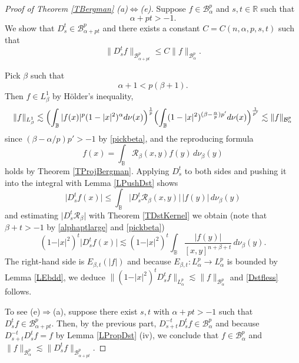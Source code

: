 \documentclass{amsart}
\theoremstyle{definition}
\theoremstyle{remark}
\begin{document}
\begin{proof}[Proof of Theorem \ref{TBergman} (a)$\Leftrightarrow$(e)]
Suppose $f\in\mathcal B^p_\alpha$ and $s,t\in\mathbb R$ such that
\begin{equation}\label{alphaptlarge}
\alpha+pt>-1.
\end{equation}
We show that $D^t_s\in\mathcal B^p_{\alpha+pt}$ and
there exists a constant $C=C(n,\alpha,p,s,t)$ such that
\begin{equation}\label{Dstfless}
\|D^t_s f\|_{\mathcal B^p_{\alpha+pt}}
\le C \|f\|_{\mathcal B^p_\alpha}.
\end{equation}

Pick $\beta$ such that
\begin{equation}\label{pickbeta}
\alpha+1<p(\beta+1).
\end{equation}
Then $f\in L^1_\beta$ by H\"{o}lder's inequality,
\begin{equation}\label{Holderin}
\|f\|_{L^1_\beta}
\lesssim \Bigl(\int_{\mathbb B}\vert f(x)\vert^p(1-\vert x\vert^2)^\alpha
d\nu(x)\Bigr)^{\frac{1}{p}}
\Bigl(\int_{\mathbb B} (1-\vert x\vert^2)^{(\beta-\frac{\alpha}{p})p'}
d\nu(x)\Bigr)^{\frac{1}{p'}}
\lesssim \|f\|_{\mathcal B^p_\alpha}
\end{equation}
since $(\beta-\alpha/p)p'>-1$ by \eqref{pickbeta},
and the reproducing formula
\begin{equation}\label{reproducing}
f(x)=\int_{\mathbb B} \mathcal R_\beta(x,y)f(y)\,d\nu_\beta(y)
\end{equation}
holds by Theorem \ref{TProjBergman}.
Applying $D^t_s$ to both sides and pushing it into the integral
with Lemma \ref{LPushDst} shows
\begin{equation*}
\vert D^t_s f(x)\vert \le\int_{\mathbb B}
\vert D^t_s \mathcal R_\beta(x,y)\vert\, \vert f(y)\vert\,d\nu_\beta(y)
\end{equation*}
and estimating $\vert D^t_s \mathcal R_\beta\vert$ with Theorem \ref{TDstKernel}
we obtain (note that $\beta+t>-1$ by \eqref{alphaptlarge} and \eqref{pickbeta})
\begin{equation*}
(1-\vert x\vert^2)^t\vert D^t_s f(x)\vert
\lesssim (1-\vert x\vert^2)^t\int_{\mathbb B}
\frac{\vert f(y)\vert}{[x,y]^{n+\beta+t}}\,d\nu_\beta(y).
\end{equation*}
The right-hand side is $E_{\beta,t}(\vert f\vert)$ and because
$E_{\beta,t}\colon L^p_\alpha\to L^p_\alpha$ is bounded by Lemma \ref{LEbdd},
we deduce
$\|(1-\vert x\vert^2)^t D^t_s f\|_{L^p_\alpha}\lesssim \|f\|_{\mathcal B^p_\alpha}$
and \eqref{Dstfless} follows.

To see (e)$\Rightarrow$(a), suppose there exist $s,t$ with $\alpha+pt>-1$
such that $D^t_s f\in\mathcal B^p_{\alpha+pt}$.
Then, by the previous part, $D^{-t}_{s+t} D^t_s f\in\mathcal B^p_\alpha$
and because $D^{-t}_{s+t} D^t_s f=f$ by Lemma \ref{LPropDst} (iv), we conclude that
$f\in\mathcal B^p_\alpha$ and
$\|f\|_{\mathcal B^p_\alpha}\lesssim \|D^t_s f\|_{\mathcal B^p_{\alpha+pt}}$.
\end{proof}
\end{document}

